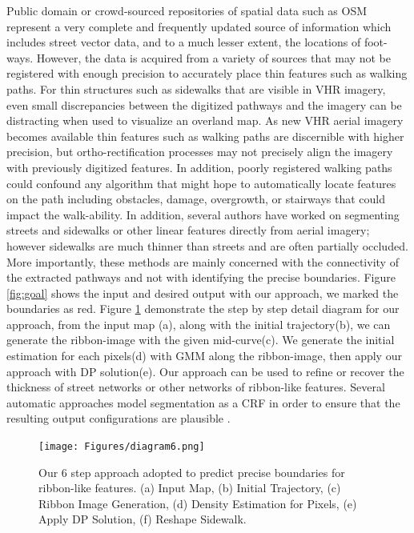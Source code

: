 Public domain or crowd-sourced repositories of spatial data such as \ac{OSM} \cite{OpenStreetMap} represent a very complete and frequently updated source of information which includes street vector data, and to a much lesser extent, the locations of foot-ways. However, the data is acquired from a variety of sources that may not be registered with enough precision to accurately place thin features such as walking paths. For thin structures such as sidewalks that are visible in \ac{VHR} imagery, even small discrepancies between the digitized pathways and the imagery can be distracting when used to visualize an overland map. As new \ac{VHR} aerial imagery becomes available thin features such as walking paths are discernible with higher precision, but ortho-rectification processes may not precisely align the imagery with previously digitized features. In addition, poorly registered walking paths could confound any algorithm that might hope to automatically locate features on the path including obstacles, damage, overgrowth, or stairways that could impact the walk-ability. In addition, several authors\cite{femiani2009interval, femiani2007road} have worked on segmenting streets and sidewalks or other linear features directly from aerial imagery; however sidewalks are much thinner than streets and are often partially occluded. More importantly, these methods are mainly concerned with the connectivity of the extracted pathways and not with identifying the precise boundaries. Figure \ref{fig:goal} shows the input and desired output with our approach, we marked the boundaries as red. Figure \ref{fig:fw_ov} demonstrate the step by step detail diagram for our approach, from the input map (a), along with the initial trajectory(b), we can generate the ribbon-image with the given mid-curve(c). We generate the initial estimation for each pixels(d) with \ac{GMM} along the ribbon-image, then apply our approach with \ac{DP} solution(e). Our approach can be used to refine or recover the thickness of street networks or other networks of ribbon-like features. Several automatic approaches model segmentation as a \ac{CRF} in order to ensure that the resulting output configurations are plausible \cite{ActiveContou09, Rother2004-ou, Achanta:149300}.

\begin{figure}[H]
    \centering
    \texttt{[image: Figures/diagram6.png]}
    \caption[Framework Overview 1]{Our 6 step approach adopted to predict precise boundaries for ribbon-like features. (a) Input Map, (b) Initial Trajectory, (c) Ribbon Image Generation, (d) Density Estimation for Pixels, (e) Apply \ac{DP} Solution, (f) Reshape Sidewalk.}
    \label{fig:fw_ov}
\end{figure}

